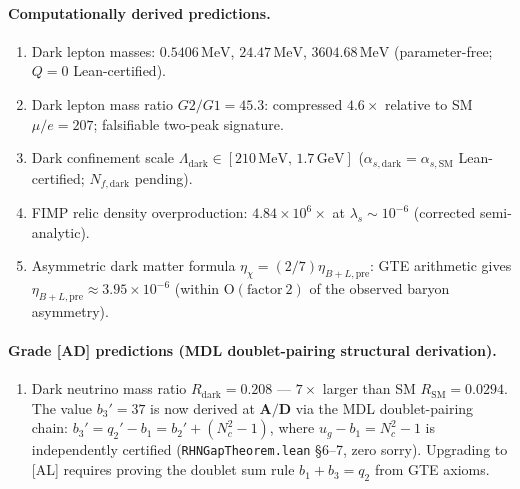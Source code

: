 \documentclass[11pt]{article}
\newcommand{\CatAD}{\textbf{A/D}}
\begin{document}
\paragraph{Computationally derived predictions.}
\begin{enumerate}
\item Dark lepton masses: $0.5406\,\mathrm{MeV}$, $24.47\,\mathrm{MeV}$, $3604.68\,\mathrm{MeV}$
      (parameter-free; $Q=0$ Lean-certified).
\item Dark lepton mass ratio $G2/G1 = 45.3$: compressed $4.6\times$ relative to SM
      $\mu/e=207$; falsifiable two-peak signature.
\item Dark confinement scale $\Lambda_\mathrm{dark} \in [210\,\mathrm{MeV},\, 1.7\,\mathrm{GeV}]$
      ($\alpha_{s,\mathrm{dark}} = \alpha_{s,\mathrm{SM}}$ Lean-certified;
      $N_{f,\mathrm{dark}}$ pending).
\item FIMP relic density overproduction: $4.84\times10^6\times$ at $\lambda_s\sim10^{-6}$
      (corrected semi-analytic).
\item Asymmetric dark matter formula $\eta_\chi = (2/7)\eta_{B+L,\mathrm{pre}}$: GTE
      arithmetic gives $\eta_{B+L,\mathrm{pre}} \approx 3.95\times10^{-6}$ (within
      $\mathrm{O}(\mathrm{factor}\ 2)$ of the observed baryon asymmetry).
\end{enumerate}

\paragraph{Grade [AD] predictions (MDL doublet-pairing structural derivation).}
\begin{enumerate}
\item Dark neutrino mass ratio $R_\mathrm{dark} = 0.208$ --- $7\times$ larger than SM
      $R_\mathrm{SM} = 0.0294$.  The value $b_3'=37$ is now derived at $\CatAD$ via the
      MDL doublet-pairing chain: $b_3' = q_2' - b_1 = b_2' + (N_c^2-1)$, where
      $u_g - b_1 = N_c^2-1$ is independently certified
      (\texttt{RHNGapTheorem.lean} \S6--7, zero sorry).  Upgrading to [AL] requires
      proving the doublet sum rule $b_1+b_3=q_2$ from GTE axioms.
\end{enumerate}
\end{document}
